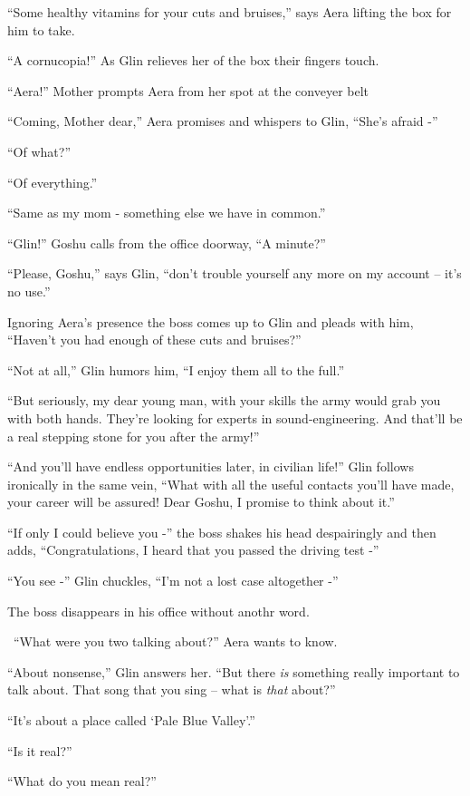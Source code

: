 \documentclass[twoside,11pt]{book}
\begin{document}
``Some healthy vitamins for your cuts and bruises,'' says Aera lifting the box for him to
take.

``A cornucopia!'' As Glin relieves her of the box their fingers touch.

``Aera!'' Mother prompts Aera from her spot at the conveyer belt

``Coming, Mother dear,'' Aera promises and whispers to Glin, ``She's afraid
-''

``Of what?''

``Of everything.''

``Same as my mom - something else we have in common.''

``Glin!'' Goshu calls from the office doorway, ``A minute?''

``Please, Goshu,'' says Glin, ``don't trouble yourself any more on my account --
it's no use.''

Ignoring Aera's presence the boss comes up to Glin and pleads with him, ``Haven't you had enough of these
cuts and bruises?''

``Not at all,'' Glin humors him, ``I enjoy them all to the full.''

``But seriously, my dear young man, with your skills the army would grab you with both hands. They're
looking for experts in sound-engineering. And that'll be a real stepping stone for you after the army!''

``And you'll have endless opportunities later, in civilian life!'' Glin follows
ironically in the same vein, ``What with all the useful contacts you'll have made, your
career will be assured!  Dear Goshu, I promise to think about it.''

``If only I could believe you -'' the boss shakes his head despairingly and
then adds, ``Congratulations, I heard that you passed the driving test -''

``You see -'' Glin chuckles, ``I'm not a lost case altogether
-''

The boss disappears in his office without anothr word.

\ ``What were you two talking about?'' Aera wants to know.

``About nonsense,'' Glin answers her. ``But there \textit{is} something really
important to talk about. That song that you sing -- what is \textit{that} about?''

``It's about a place called `Pale Blue Valley'.''

``Is it real?''

``What do you mean real?''
\end{document}

